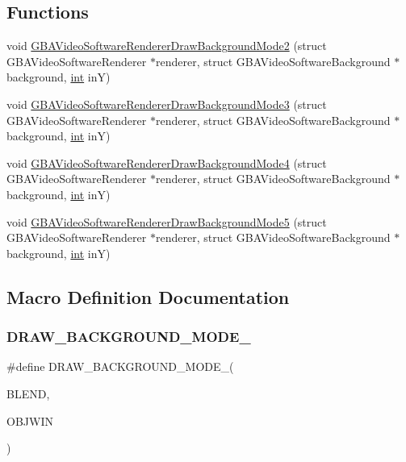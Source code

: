 \subsection*{Functions}
\begin{DoxyCompactItemize}
\item 
void \mbox{\hyperlink{software-bg_8c_ab7b1f357af479cc6de7fc7af27f6b1e5}{G\+B\+A\+Video\+Software\+Renderer\+Draw\+Background\+Mode2}} (struct G\+B\+A\+Video\+Software\+Renderer $\ast$renderer, struct G\+B\+A\+Video\+Software\+Background $\ast$background, \mbox{\hyperlink{ioapi_8h_a787fa3cf048117ba7123753c1e74fcd6}{int}} inY)
\item 
void \mbox{\hyperlink{software-bg_8c_acbe6dcdc03c214a314aeaaca61d44be6}{G\+B\+A\+Video\+Software\+Renderer\+Draw\+Background\+Mode3}} (struct G\+B\+A\+Video\+Software\+Renderer $\ast$renderer, struct G\+B\+A\+Video\+Software\+Background $\ast$background, \mbox{\hyperlink{ioapi_8h_a787fa3cf048117ba7123753c1e74fcd6}{int}} inY)
\item 
void \mbox{\hyperlink{software-bg_8c_a405f08b46da4ca30878baab466bd2175}{G\+B\+A\+Video\+Software\+Renderer\+Draw\+Background\+Mode4}} (struct G\+B\+A\+Video\+Software\+Renderer $\ast$renderer, struct G\+B\+A\+Video\+Software\+Background $\ast$background, \mbox{\hyperlink{ioapi_8h_a787fa3cf048117ba7123753c1e74fcd6}{int}} inY)
\item 
void \mbox{\hyperlink{software-bg_8c_a9d87077d27cf5f313462c78d226d1956}{G\+B\+A\+Video\+Software\+Renderer\+Draw\+Background\+Mode5}} (struct G\+B\+A\+Video\+Software\+Renderer $\ast$renderer, struct G\+B\+A\+Video\+Software\+Background $\ast$background, \mbox{\hyperlink{ioapi_8h_a787fa3cf048117ba7123753c1e74fcd6}{int}} inY)
\end{DoxyCompactItemize}


\subsection{Macro Definition Documentation}
\mbox{\label{software-bg_8c_aeeccdce3997dcb6a4768873b8fbd1bdd}} 
\subsubsection{\texorpdfstring{D\+R\+A\+W\+\_\+\+B\+A\+C\+K\+G\+R\+O\+U\+N\+D\+\_\+\+M\+O\+D\+E\+\_}{DRAW\_BACKGROUND\_MODE\_2}}
{\footnotesize\ttfamily \#define D\+R\+A\+W\+\_\+\+B\+A\+C\+K\+G\+R\+O\+U\+N\+D\+\_\+\+M\+O\+D\+E\+\_(\begin{DoxyParamCaption}\item[{}]{B\+L\+E\+ND,  }\item[{}]{O\+B\+J\+W\+IN }\end{DoxyParamCaption})}

